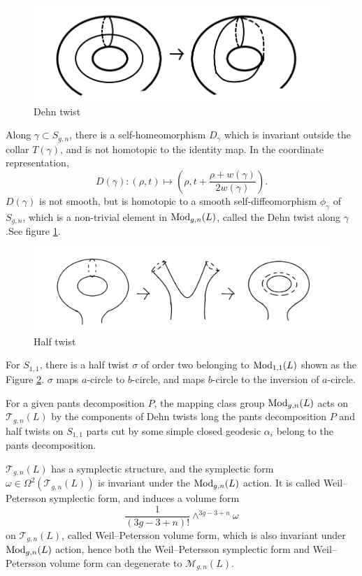 \begin{figure}[h]
    \centering
    \includegraphics[width=4 in]{picture/dehntwist.png}
    \caption{Dehn twist}
    \label{fig:dehntwist}
\end{figure}

Along $\gamma\subset S_{g,n}$, there is a self-homeomorphism $D_{\gamma}$ which is invariant outside the collar $T(\gamma)$, and is not homotopic to the identity map.  In the coordinate representation, $$
 D(\gamma) \colon (\rho,t)\mapsto (\rho, t+\frac{\rho+w(\gamma)}{2w(\gamma)}).
 $$
 $D(\gamma)$ is not smooth, but is homotopic to a smooth self-diffeomorphism $\phi_\gamma$ of $S_{g,n}$, which is a non-trivial element in $\operatorname{Mod}_{g,n}(L)$, called the Dehn twist along $\gamma$.See figure \ref{fig:dehntwist}.
 
 \begin{figure}[h]
    \centering
    \includegraphics[width=5 in]{picture/halftwist.png}
    \caption{Half twist}
    \label{fig:halftwist}
\end{figure}

For $S_{1,1}$, there is a half twist  $\sigma$ of order two belonging to $\operatorname{Mod}_{1,1}(L)$ shown as the Figure \ref{fig:halftwist}. $\sigma$ maps  $a$-circle to $b$-circle, and maps $b$-circle to the inversion of  $a$-circle. 

For a given pants decomposition $P$, the mapping class group $\operatorname{Mod}_{g,n}(L)$ acts on $\mathscr{T}_{g,n}(L)$ by the components of Dehn twists long the pants decomposition $P$ and half twists on  $S_{1,1}$ parts cut by some simple closed geodesic $\alpha_i$ belong to the pants decomposition.  

 
 
 $\mathscr{T}_{g,n}(L)$ has a symplectic structure, and the symplectic form $\omega\in \Omega^2(\mathscr{T}_{g,n}(L))$ is invariant under the $\operatorname{Mod}_{g,n}(L)$ action. It is called Weil--Petersson symplectic form, and induces a volume form $$
 \frac{1}{(3g-3+n)!}\wedge^{3g-3+n}\omega
 $$
 on $\mathscr{T}_{g,n}(L)$, called Weil--Petersson volume form, which is also invariant under $\operatorname{Mod}_{g,n}(L)$ action, hence both the Weil--Petersson symplectic form and Weil--Petersson volume form can degenerate  to $\mathscr{M}_{g,n}(L)$.
 
